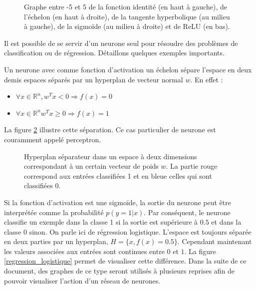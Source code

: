 \begin{figure}
\begin{center}
\begin{tabular}{cc}
\end{tabular}
\caption{Graphe entre -5 et 5 de la fonction identité (en haut à gauche), de l'échelon (en haut à droite), de la tangente hyperbolique (au milieu à gauche), de la sigmoïde (au milieu à droite) et de ReLU (en bas).} 
\label{fonctions_activation}
\end{center}
\end{figure}

Il est possible de se servir d'un neurone seul pour résoudre des problèmes de classification ou de régression. Détaillons quelques exemples importants.

\begin{example}[Perceptron]
Un neurone avec comme fonction d'activation un échelon sépare l'espace en deux demis espaces séparés par un hyperplan de vecteur normal $w$. En effet :

\begin{itemize}
\item $ \forall x \in \mathbb{R}^n, w^Tx < 0 \Rightarrow f(x) = 0$
\item $ \forall x \in \mathbb{R}^n w^Tx \geq 0 \Rightarrow f(x) = 1$
\end{itemize}

La figure \ref{hyperplan} illustre cette séparation. Ce cas particulier de neurone est couramment appelé perceptron.
\end{example}

\begin{figure}
\begin{center}

\caption{Hyperplan séparateur dans un espace à deux dimensions correspondant à un certain vecteur de poids $w$. La partie rouge correspond aux entrées classifiées 1 et en bleue celles qui sont classifiées 0.}
\label{hyperplan}
\end{center}
\end{figure}

\begin{example}
Si la fonction d'activation est une sigmoïde, la sortie du neurone peut être interprétée comme la probabilité $p(y=1|x)$. Par conséquent, le neurone classifie un exemple dans la classe 1 si la sortie est supérieure à $0.5$ et dans la classe 0 sinon. On parle ici de régression logistique. L'espace est toujours séparée en deux parties par un hyperplan, $H = \{x, f(x)=0.5\}$. Cependant maintenant les valeurs associées aux entrées sont continues entre $0$ et $1$. La figure \ref{regression_logistique} permet de visualiser cette différence. Dans la suite de ce document, des graphes de ce type seront utilisés à plusieurs reprises afin de pouvoir visualiser l'action d'un réseau de neurones.
\end{example}

